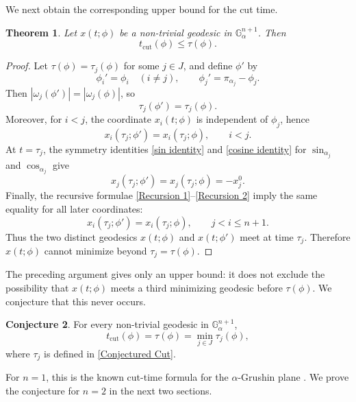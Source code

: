 \documentclass[12pt]{amsart}
\numberwithin{equation}{section}
\theoremstyle{plain}
\newtheorem{theorem}{Theorem}[section]
\theoremstyle{definition}
\newtheorem{conj}[theorem]{Conjecture}%
\theoremstyle{remark}
\begin{document}
We next obtain the corresponding upper bound for the cut time.

\begin{theorem}\label{upper bound cut time}
    Let \(x(t;\phi)\) be a non-trivial geodesic in \(\mathbb G^{n+1}_\alpha\). Then
    \begin{equation}\label{cut time inequality}
        t_{\operatorname{cut}}(\phi)\leq \tau(\phi).
    \end{equation}
\end{theorem}

\begin{proof}
    Let \(\tau(\phi)=\tau_j(\phi)\) for some \(j\in J\), and define \(\phi'\) by
    \[
        \phi_i'=\phi_i\quad(i\neq j),
        \qquad
        \phi_j'=\pi_{\alpha_j}-\phi_j.
    \]
    Then \(|\omega_j(\phi')|=|\omega_j(\phi)|\), so
    \[
        \tau_j(\phi')=\tau_j(\phi).
    \]
    Moreover, for \(i<j\), the coordinate \(x_i(t;\phi)\) is independent of \(\phi_j\), hence
    \[
        x_i(\tau_j;\phi')=x_i(\tau_j;\phi),
        \qquad i<j.
    \]
    At \(t=\tau_j\), the symmetry identities \eqref{sin identity} and \eqref{cosine identity} for \(\sin_{\alpha_j}\) and
    \(\cos_{\alpha_j}\) give
    \[
        x_j(\tau_j;\phi')=x_j(\tau_j;\phi)=-x_j^0.
    \]
    Finally, the recursive formulae \eqref{Recursion 1}--\eqref{Recursion 2} imply the same
    equality for all later coordinates:
    \[
        x_i(\tau_j;\phi')=x_i(\tau_j;\phi),
        \qquad j<i\leq n+1.
    \]
    Thus the two distinct geodesics \(x(t;\phi)\) and \(x(t;\phi')\) meet at time \(\tau_j\).
    Therefore \(x(t;\phi)\) cannot minimize beyond \(\tau_j=\tau(\phi)\).
\end{proof}

The preceding argument gives only an upper bound: it does not exclude the possibility that
\(x(t;\phi)\) meets a third minimizing geodesic before \(\tau(\phi)\). We conjecture that
this never occurs.

\begin{conj}\label{conjecture}
    For every non-trivial geodesic in \(\mathbb G^{n+1}_\alpha\),
    \[
        t_{\operatorname{cut}}(\phi)
        =
        \tau(\phi)
        =
        \min_{j\in J}\tau_j(\phi),
    \]
    where \(\tau_j\) is defined in \eqref{Conjectured Cut}.
\end{conj}

For \(n=1\), this is the known cut-time formula for the \(\alpha\)-Grushin plane
\cite{AgrachevBarilariBoscainBook2020,Borza2022}. We prove the conjecture for \(n=2\) in
the next two sections.
\end{document}
